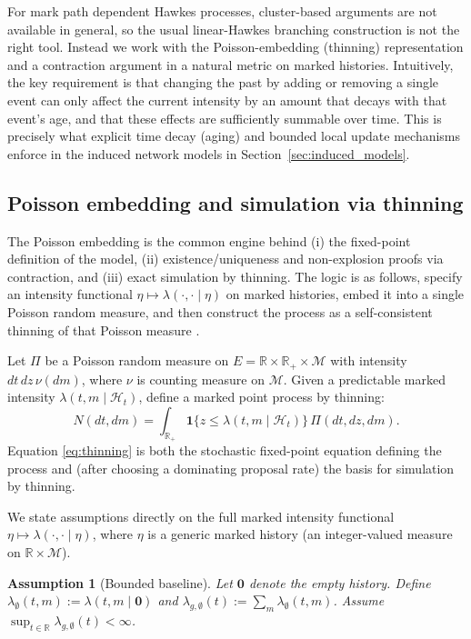 \documentclass[12pt]{article}
\newtheorem{assumption}[theorem]{Assumption}
\begin{document}
For mark path dependent Hawkes processes, cluster-based arguments are not available in general, so the usual linear-Hawkes branching construction is not the right tool. Instead we work with the Poisson-embedding (thinning) representation and a contraction argument in a natural metric on marked histories. Intuitively, the key requirement is that changing the past by adding or removing a single event can only affect the current intensity by an amount that decays with that event’s age, and that these effects are sufficiently summable over time. This is precisely what explicit time decay (aging) and bounded local update mechanisms enforce in the induced network models in Section~\ref{sec:induced_models}.

\subsection{Poisson embedding and simulation via thinning}\label{sec:poisson_embedding}

The Poisson embedding is the common engine behind (i) the fixed-point definition of the model, (ii) existence/uniqueness and non-explosion proofs via contraction, and (iii) exact simulation by thinning. The logic is as follows, specify an intensity functional $\eta\mapsto \lambda(\cdot,\cdot\mid\eta)$ on marked histories, embed it into a single Poisson random measure, and then construct the process as a self-consistent thinning of that Poisson measure \citep{bremaud1996stability}.

Let $\Pi$ be a Poisson random measure on $E=\mathbb R\times\mathbb R_+\times\mathcal M$ with intensity $dt\,dz\,\nu(dm)$, where $\nu$ is counting measure on $\mathcal M$. Given a predictable marked intensity $\lambda(t,m\mid\mathcal H_t)$, define a marked point process by thinning:
\begin{equation}\label{eq:thinning}
N(dt,dm)=\int_{\mathbb R_+}\mathbf 1\{z\le \lambda(t,m\mid\mathcal H_t)\}\,\Pi(dt,dz,dm).
\end{equation}
Equation \eqref{eq:thinning} is both the stochastic fixed-point equation defining the process and (after choosing a dominating proposal rate) the basis for simulation by thinning.

We state assumptions directly on the full marked intensity functional $\eta\mapsto \lambda(\cdot,\cdot\mid\eta)$, where $\eta$ is a generic marked history (an integer-valued measure on $\mathbb R\times\mathcal M$). 

\begin{assumption}[Bounded baseline]\label{ass:H0}
Let $\mathbf 0$ denote the empty history. Define $\lambda_{\emptyset}(t,m):=\lambda(t,m\mid\mathbf 0)$ and $\lambda_{g,\emptyset}(t):=\sum_m \lambda_{\emptyset}(t,m)$. Assume $\sup_{t\in\mathbb R}\lambda_{g,\emptyset}(t)<\infty$.
\end{assumption}
\end{document}
